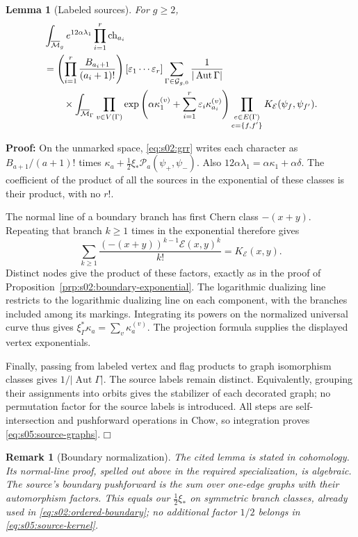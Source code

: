 \documentclass[a4paper,10pt]{article}
\numberwithin{equation}{section}
\newcommand{\MM}{\overline{\mathcal{M}}}
\theoremstyle{paperplain}
\newtheorem{lmm}[thm]{Lemma}
\theoremstyle{paperremark}
\newtheorem{rmk}{Remark}[section]
\theoremstyle{paperplain}
\newenvironment{prf}{\noindent \textbf{Proof: }}{\hfill $\mdlgwhtsquare$\par\addvspace{0.5\baselineskip}}
\begin{document}
\begin{lmm}[Labeled sources]\label{lmm:s05:labelled-sources}
For $g\geq2$,
\begin{align}
 &\int_{\MM_g}e^{12\alpha\lambda_1}
              \prod_{i=1}^r\mathrm{ch}_{a_i}\notag\\
 &=\left(\prod_{i=1}^r\frac{B_{a_i+1}}{(a_i+1)!}\right)
 [\varepsilon_1\cdots\varepsilon_r]
 \sum_{\Gamma\in\mathcal G_{g,0}}
 \frac1{|\operatorname{Aut}\Gamma|}\notag\\
 &\qquad\times\int_{\MM_\Gamma}
 \prod_{v\in V(\Gamma)}
  \exp\left(\alpha\kappa_1^{(v)}+
          \sum_{i=1}^r\varepsilon_i\kappa_{a_i}^{(v)}\right)
 \prod_{\substack{e\in E(\Gamma)\\e=\{f,f'\}}}
       K_{\mathcal E}(\psi_f,\psi_{f'}).
 \label{eq:s05:source-graphs}
\end{align}
\end{lmm}
\begin{prf}
On the unmarked space, \eqref{eq:s02:grr} writes each character as
$B_{a+1}/(a+1)!$ times
$\kappa_a+\tfrac12\xi_*\mathcal P_a(\psi_+,\psi_-)$.
Also $12\alpha\lambda_1=\alpha\kappa_1+\alpha\delta$.
The coefficient of the product of all the sources in the
exponential of these classes is their product, with no $r!$.

The normal line of a boundary branch has first Chern class
$-(x+y)$. Repeating that branch $k\geq1$ times in the exponential
therefore gives
\[
 \sum_{k\geq1}\frac{(-(x+y))^{k-1}\mathcal E(x,y)^k}{k!}
 =K_{\mathcal E}(x,y).
\]
Distinct nodes give the product of these factors, exactly as in the
proof of Proposition~\ref{prp:s02:boundary-exponential}. The
logarithmic dualizing line restricts to the logarithmic dualizing
line on each component, with the branches included among its
markings. Integrating its powers on the normalized universal curve
thus gives $\xi_\Gamma^*\kappa_a=\sum_v\kappa_a^{(v)}$.
The projection formula supplies the displayed vertex exponentials.

Finally, passing from labeled vertex and flag products to graph
isomorphism classes gives $1/|\operatorname{Aut}\Gamma|$.
The source labels remain distinct. Equivalently, grouping their
assignments into orbits gives the stabilizer of each decorated
graph; no permutation factor for the source labels is introduced.
All steps are self-intersection and pushforward operations in Chow,
so integration proves \eqref{eq:s05:source-graphs}.
\end{prf}

\begin{rmk}[Boundary normalization]
The cited lemma is stated in cohomology. Its normal-line proof,
spelled out above in the required specialization, is algebraic.
The source's boundary pushforward is the sum over one-edge graphs
with their automorphism factors. This equals our
$\tfrac12\xi_*$ on symmetric branch classes, already used in
\eqref{eq:s02:ordered-boundary}; no additional factor $1/2$ belongs
in \eqref{eq:s05:source-kernel}.
\end{rmk}
\end{document}
